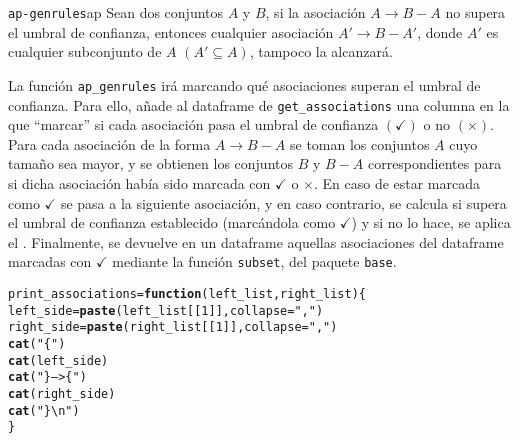 \documentclass[12pt]{report}\usepackage[]{graphicx}\usepackage[dvipsnames]{xcolor}
\makeatletter
\newcommand{\hlnum}[1]{\textcolor[rgb]{0.686,0.059,0.569}{#1}}%
\newcommand{\hlstr}[1]{\textcolor[rgb]{0.192,0.494,0.8}{#1}}%
\newcommand{\hlstd}[1]{\textcolor[rgb]{0.345,0.345,0.345}{#1}}%
\newcommand{\hlkwa}[1]{\textcolor[rgb]{0.161,0.373,0.58}{\textbf{#1}}}%
\newcommand{\hlkwb}[1]{\textcolor[rgb]{0.69,0.353,0.396}{#1}}%
\newcommand{\hlkwc}[1]{\textcolor[rgb]{0.333,0.667,0.333}{#1}}%
\newcommand{\hlkwd}[1]{\textcolor[rgb]{0.737,0.353,0.396}{\textbf{#1}}}%
\newenvironment{kframe}{%
 \def\at@end@of@kframe{}%
 \ifinner\ifhmode%
  \def\at@end@of@kframe{\end{minipage}}%
  \begin{minipage}{\columnwidth}%
 \fi\fi%
 \def\FrameCommand##1{\hskip\@totalleftmargin \hskip-\fboxsep
 \colorbox{shadecolor}{##1}\hskip-\fboxsep
     \hskip-\linewidth \hskip-\@totalleftmargin \hskip\columnwidth}%
 \MakeFramed {\advance\hsize-\width
   \@totalleftmargin\z@ \linewidth\hsize
   \@setminipage}}%
 {\par\unskip\endMakeFramed%
 \at@end@of@kframe}
\newenvironment{knitrout}{}{} %
\makeatother
\begin{document}
			\begin{teorema}{\texttt{ap-genrules}}{ap}
				Sean dos conjuntos $A$ y $B$, si la asociación $A \rightarrow B - A$ no supera el umbral de confianza, entonces cualquier asociación $A' \rightarrow B - A'$, donde $A'$ es cualquier subconjunto de $A$ $(A' \subseteq A)$, tampoco la alcanzará. 
			\end{teorema}
			
			La función \texttt{ap\_genrules} irá marcando qué asociaciones superan el umbral de confianza. Para ello, añade al dataframe de \texttt{get\_associations} una columna en la que ``marcar'' si cada asociación pasa el umbral de confianza $(\checkmark)$ o no $(\times)$. Para cada asociación de la forma $A \rightarrow B - A$ se toman los conjuntos $A$ cuyo tamaño sea mayor, y se obtienen los conjuntos $B$ y $B - A$ correspondientes para si dicha asociación había sido marcada con $\checkmark$ o $\times$. En caso de estar marcada como $\checkmark$ se pasa a la siguiente asociación, y en caso contrario, se calcula si supera el umbral de confianza establecido (marcándola como $\checkmark$) y si no lo hace, se aplica el . Finalmente, se devuelve en un dataframe aquellas asociaciones del dataframe marcadas con $\checkmark$ mediante la función \texttt{subset}, del paquete \texttt{base}. \\ 
			
\begin{knitrout}
\color{fgcolor}\begin{kframe}
\begin{alltt}
\hlstd{print_associations} \hlkwb{=} \hlkwa{function}\hlstd{(}\hlkwc{left_list}\hlstd{,} \hlkwc{right_list}\hlstd{) \{}
        \hlstd{left_side} \hlkwb{=} \hlkwd{paste}\hlstd{(left_list[[}\hlnum{1}\hlstd{]],} \hlkwc{collapse} \hlstd{=} \hlstr{","}\hlstd{)}
        \hlstd{right_side} \hlkwb{=} \hlkwd{paste}\hlstd{(right_list[[}\hlnum{1}\hlstd{]],} \hlkwc{collapse} \hlstd{=} \hlstr{","}\hlstd{)}
        \hlkwd{cat}\hlstd{(}\hlstr{"\{"}\hlstd{)}
        \hlkwd{cat}\hlstd{(left_side)}
        \hlkwd{cat}\hlstd{(}\hlstr{"\} --> \{"}\hlstd{)}
        \hlkwd{cat}\hlstd{(right_side)}
        \hlkwd{cat}\hlstd{(}\hlstr{"\}\textbackslash{}n"}\hlstd{)}
\hlstd{\}}
\end{alltt}
\end{kframe}
\end{knitrout}
			
\end{document}
